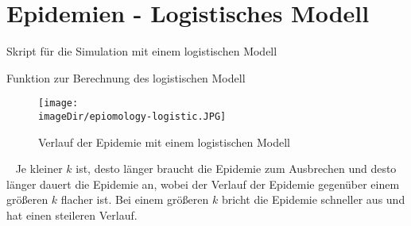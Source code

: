 \section{Epidemien - Logistisches Modell}
\label{sec:epidemiology-logisitc-model}

\begin{code}
	\caption{Skript für die Simulation mit einem logistischen Modell}
	\label{source:epidemiology-logistic-program}
\end{code}

\begin{code}
	\caption{Funktion zur Berechnung des logistischen Modell}
	\label{source:epidemiology-logistic}
\end{code}

\begin{figure}[h]
	\centering
	\texttt{[image: \\imageDir/epiomology-logistic.JPG]}
	\caption{Verlauf der Epidemie mit einem logistischen Modell}
	\label{test:epidemiology-logistic}
\end{figure}
\ \newline
Je kleiner $k$ ist, desto länger braucht die Epidemie zum Ausbrechen und desto länger dauert die Epidemie an, wobei der Verlauf der Epidemie gegenüber einem größeren $k$ flacher ist. Bei einem größeren $k$ bricht die Epidemie schneller aus und hat einen steileren Verlauf.
